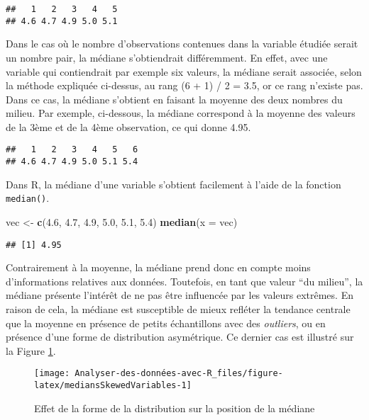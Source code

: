 \documentclass[
  french,
]{book}
\newenvironment{Shaded}{\begin{snugshade}}{\end{snugshade}}
\newcommand{\DataTypeTok}[1]{\textcolor[rgb]{0.13,0.29,0.53}{#1}}
\newcommand{\FloatTok}[1]{\textcolor[rgb]{0.00,0.00,0.81}{#1}}
\newcommand{\KeywordTok}[1]{\textcolor[rgb]{0.13,0.29,0.53}{\textbf{#1}}}
\newcommand{\NormalTok}[1]{#1}
\newcommand{\StringTok}[1]{\textcolor[rgb]{0.31,0.60,0.02}{#1}}
\begin{document}
\begin{verbatim}
##   1   2   3   4   5 
## 4.6 4.7 4.9 5.0 5.1
\end{verbatim}

Dans le cas où le nombre d'observations contenues dans la variable étudiée serait un nombre pair, la médiane s'obtiendrait différemment. En effet, avec une variable qui contiendrait par exemple six valeurs, la médiane serait associée, selon la méthode expliquée ci-dessus, au rang (6 + 1) / 2 = 3.5, or ce rang n'existe pas. Dans ce cas, la médiane s'obtient en faisant la moyenne des deux nombres du milieu. Par exemple, ci-dessous, la médiane correspond à la moyenne des valeurs de la 3ème et de la 4ème observation, ce qui donne 4.95.

\begin{verbatim}
##   1   2   3   4   5   6 
## 4.6 4.7 4.9 5.0 5.1 5.4
\end{verbatim}

Dans R, la médiane d'une variable s'obtient facilement à l'aide de la fonction \texttt{median()}.

\begin{Shaded}
\begin{Highlighting}[]
\NormalTok{vec <-}\StringTok{ }\KeywordTok{c}\NormalTok{(}\FloatTok{4.6}\NormalTok{, }\FloatTok{4.7}\NormalTok{, }\FloatTok{4.9}\NormalTok{, }\FloatTok{5.0}\NormalTok{, }\FloatTok{5.1}\NormalTok{, }\FloatTok{5.4}\NormalTok{)}
\KeywordTok{median}\NormalTok{(}\DataTypeTok{x =}\NormalTok{ vec)}
\end{Highlighting}
\end{Shaded}

\begin{verbatim}
## [1] 4.95
\end{verbatim}

Contrairement à la moyenne, la médiane prend donc en compte moins d'informations relatives aux données. Toutefois, en tant que valeur ``du milieu'', la médiane présente l'intérêt de ne pas être influencée par les valeurs extrêmes. En raison de cela, la médiane est susceptible de mieux refléter la tendance centrale que la moyenne en présence de petits échantillons avec des \emph{outliers}, ou en présence d'une forme de distribution asymétrique. Ce dernier cas est illustré sur la Figure \ref{fig:mediansSkewedVariables}.

\begin{figure}

{\centering \texttt{[image: Analyser-des-données-avec-R\_files/figure-latex/mediansSkewedVariables-1]} 

}

\caption{Effet de la forme de la distribution sur la position de la médiane}\label{fig:mediansSkewedVariables}
\end{figure}
\end{document}
